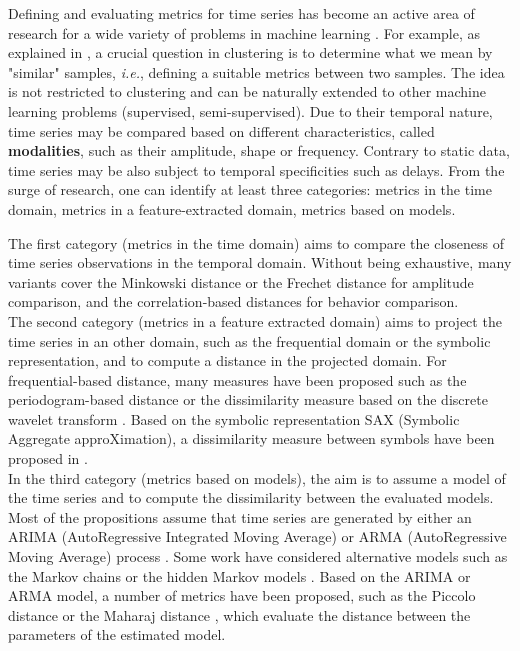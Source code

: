 Defining and evaluating metrics for time series has become an active area of research for a wide variety of problems in machine learning \cite{Ding2008, Najmeddine2012}. For example, as explained in \cite{Montero2014}, a crucial question in clustering is to determine what we mean by "similar" samples, \textit{i.e.}, defining a suitable metrics between two samples. The idea is not restricted to clustering and can be naturally extended to other machine learning problems (supervised, semi-supervised).
Due to their temporal nature, time series may be compared based on different characteristics, called \textbf{modalities}, such as their amplitude, shape or frequency. Contrary to static data, time series may be also subject to temporal specificities such as delays. From the surge of research, one can identify at least three categories: metrics in the time domain, metrics in a feature-extracted domain, metrics based on models.

The first category (metrics in the time domain) aims to compare the closeness of time series observations in the temporal domain. Without being exhaustive, many variants cover the Minkowski distance or the Frechet distance \cite{Maurice1906} for amplitude comparison, and the correlation-based distances \cite{Douzal-Chouakria2003,AhlameDouzal-Chouakria2012,Chouakria2007,Benesty2009}for behavior comparison. \\
The second category (metrics in a feature extracted domain) aims to project the time series in an other domain, such as the frequential domain or the symbolic representation, and to compute a distance in the projected domain. For frequential-based distance, many measures have been proposed such as the periodogram-based distance \cite{Caiado2006c} or the dissimilarity measure based on the discrete wavelet transform \cite{Chan2008}. Based on the symbolic representation SAX (Symbolic Aggregate approXimation), a dissimilarity measure between symbols have been proposed in \cite{Lin2003b}. \\
In the third category (metrics based on models), the aim is to assume a model of the time series and to compute the dissimilarity between the evaluated models. Most of the propositions assume that time series are generated by either an ARIMA (AutoRegressive Integrated Moving Average) or ARMA (AutoRegressive Moving Average) process \cite{Kalpakis,Martin2000}. Some work have considered alternative models such as the Markov chains \cite{Ramoni2002} or the hidden Markov models \cite{Smyth1997}. Based on the ARIMA or ARMA model, a number of metrics have been proposed, such as the Piccolo distance \cite{Piccolo1990} or the Maharaj distance \cite{Maharaj1996}, which evaluate the distance between the parameters of the estimated model.

